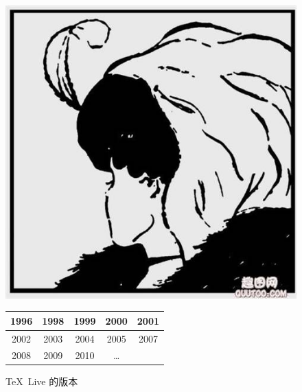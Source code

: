 \documentclass[nofonts]{ctexart}
\begin{document}
\begin{figure}
	\begin{minipage}[b]{.5\textwidth}
		\centering
		\includegraphics[width=.4\textwidth]{lady.jpg}
		\caption{\TeX\ Live 吉祥物狮子}
	\end{minipage}%
	\begin{minipage}[b]{.5\textwidth}
		\centering
		\begin{tabular}{|*{5}{c|}}
			\hline
			1996	& 1998	& 1999	& 2000	& 2001	\\ \hline
			2002	& 2003	& 2004	& 2005	& 2007	\\ \hline
			2008	& 2009	& 2010	& \dots	&		\\
			\hline
		\end{tabular}
		\captionsetup{type=table}
		\caption{\TeX\ Live 的版本}
	\end{minipage}
\end{figure}
\end{document}
